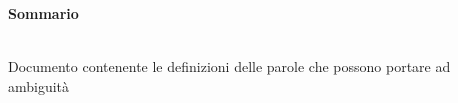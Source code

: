 \noindent\begin{Large}\textbf{Sommario}\end{Large}\\

\noindent Documento contenente le definizioni delle parole che possono portare ad ambiguità
\\